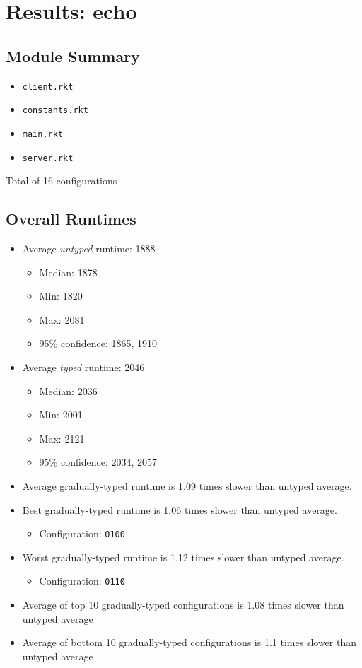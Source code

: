 \documentclass{article}
\newcommand{\mono}[1]{\texttt{#1}}
\begin{document}
\section{Results: echo}

\subsection{Module Summary}
\begin{itemize}
\item \mono{client.rkt}
\item \mono{constants.rkt}
\item \mono{main.rkt}
\item \mono{server.rkt}\end{itemize}
Total of 16 configurations

\subsection{Overall Runtimes}
\begin{itemize}
\item Average \emph{untyped} runtime: 1888
  \begin{itemize}
  \item Median: 1878
  \item Min: 1820
  \item Max: 2081
  \item 95\% confidence: 1865, 1910
  \end{itemize}
\item Average \emph{typed} runtime: 2046
  \begin{itemize}
  \item Median: 2036
  \item Min: 2001
  \item Max: 2121
  \item 95\% confidence: 2034, 2057
  \end{itemize}
\item Average gradually-typed runtime is 1.09 times slower than untyped average.
\item Best gradually-typed runtime is 1.06 times slower than untyped average.
\begin{itemize}\item Configuration: \mono{0100}\end{itemize}
\item Worst gradually-typed runtime is 1.12 times slower than untyped average.
\begin{itemize}\item Configuration: \mono{0110}\end{itemize}
\item Average of top 10 gradually-typed configurations is 1.08 times slower than untyped average
\item Average of bottom 10 gradually-typed configurations is 1.1 times slower than untyped average
\end{itemize}
\end{document}
